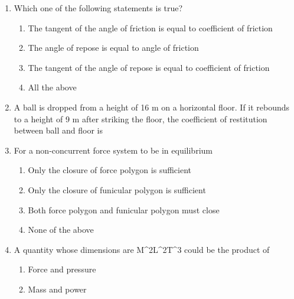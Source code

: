 \documentclass[11pt,a4paper]{article}
\begin{document}
\begin{enumerate}
\\
\item{Which one of the following statements is true?}
\begin{enumerate}[label=\Alph*.]
\item{The tangent of the angle of friction is equal to coefficient of friction}
\item{The angle of repose is equal to angle of friction}
\item{The tangent of the angle of repose is equal to coefficient of friction}
\item{All the above}
\end{enumerate}
\item{A ball is dropped from a height of 16 m on a horizontal floor. If it rebounds to a height of 9 m after striking the floor, the coefficient of restitution between ball and floor is}
\\
\item{For a non-concurrent force system to be in equilibrium}
\begin{enumerate}[label=\Alph*.]
\item{Only the closure of force polygon is sufficient}
\item{Only the closure of funicular polygon is sufficient}
\item{Both force polygon and funicular polygon must close}
\item{None of the above}
\end{enumerate}
\item{A quantity whose dimensions are M\^{}2L\^{}2T\^{}3 could be the product of}
\begin{enumerate}[label=\Alph*.]
\item{Force and pressure}
\item{Mass and power}

\end{enumerate}
\end{enumerate}
\end{document}
